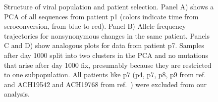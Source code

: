 \documentclass[rmp]{revtex4}
\begin{document}
\begin{figure}[ht]
\begin{center}
\caption{Structure of viral population and patient selection.
Panel A) shows a PCA of all sequences from patient p1 (colors indicate time from
seroconversion, from blue to red). Panel B) Allele frequency trajectories for nonsynonymous
changes in the same patient. Panels C and D) show analogous plots for data from
patient p7. Samples after day 1000 split into two clusters in the PCA and no
mutations that arise after day 1000 fix, presumably because they are restricted
to one subpopulation. All patients like p7 (p4, p7, p8, p9 from ref.~\citealp{shankarappa_consistent_1999} and
ACH19542 and ACH19768 from ref.~\citealp{bunnik_autologous_2008}) were excluded
from our analysis.}
\label{fig:aftp}
\end{center}
\end{figure}

\newpage
\end{document}
